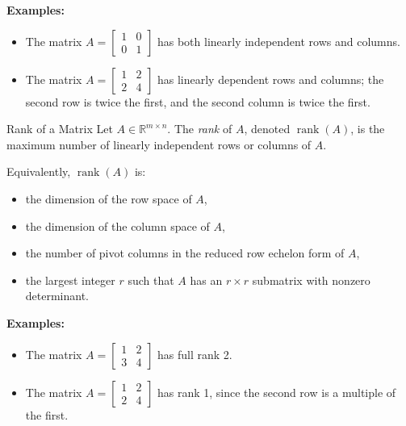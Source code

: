 \textbf{Examples:}
\begin{itemize}
    \item The matrix \( A = \begin{bmatrix}1 & 0 \\ 0 & 1\end{bmatrix} \) has both linearly independent rows and columns.
    \item The matrix \( A = \begin{bmatrix}1 & 2 \\ 2 & 4\end{bmatrix} \) has linearly dependent rows and columns; the second row is twice the first, and the second column is twice the first.
\end{itemize}

\vspace{1em}

\begin{definition}{Rank of a Matrix}{}{}
Let \( A \in \mathbb{R}^{m \times n} \). The \emph{rank} of \( A \), denoted \( \operatorname{rank}(A) \), is the maximum number of linearly independent rows or columns of \( A \).

Equivalently, \( \operatorname{rank}(A) \) is:
\begin{itemize}
  \item the dimension of the row space of \( A \),
  \item the dimension of the column space of \( A \),
  \item the number of pivot columns in the reduced row echelon form of \( A \),
  \item the largest integer \( r \) such that \( A \) has an \( r \times r \) submatrix with nonzero determinant.
\end{itemize}
\end{definition}

\textbf{Examples:}
\begin{itemize}
    \item The matrix \( A = \begin{bmatrix}1 & 2 \\ 3 & 4\end{bmatrix} \) has full rank 2.
    \item The matrix \( A = \begin{bmatrix}1 & 2 \\ 2 & 4\end{bmatrix} \) has rank 1, since the second row is a multiple of the first.
\end{itemize}

